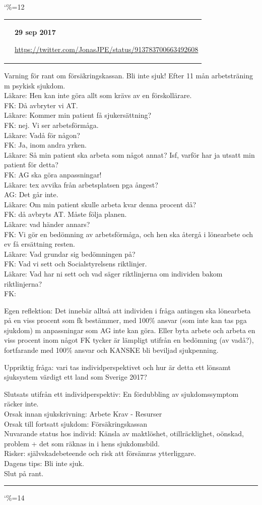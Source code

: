 \documentclass[a4paper]{article}
\makeatletter
\newcommand{\entry}{
\catcode`\%=12
\@entry}
\newcommand{\@entry}[3]{
\bigskip
\begin{tabular*}{\textwidth}{l m{\textwidth-4cm}}
\qrcode{#3} & \textbf{#1}

\medskip

\url{#3}

\end{tabular*}

\medskip


\begin{multicols}{2}
#2
\end{multicols}

\medskip
\hrule

\catcode`\%=14
}
\makeatother
\begin{document}
{\entry{29 sep 2017}{Varning för rant om försäkringskassan. Bli inte sjuk! Efter 11 mån arbetsträning m psykisk sjukdom.\\
Läkare: Hen kan inte göra allt som krävs av en förskollärare.\\
FK: Då avbryter vi AT.\\
Läkare: Kommer min patient få sjukersättning?\\
FK: nej. Vi ser arbetsförmåga.\\
Läkare: Vadå för någon?\\
FK: Ja, inom andra yrken.\\
Läkare: Så min patient ska arbeta som något annat? Isf, varför har ja utsatt min patient för detta?\\
FK: AG ska göra anpassningar!\\
Läkare: tex avvika från arbetsplatsen pga ångest?\\
AG: Det går inte.\\
Läkare: Om min patient skulle arbeta kvar denna procent då?\\
FK: då avbryts AT. Måste följa planen.\\
Läkare: vad händer annars?\\
FK: Vi gör en bedömning av arbetsförmåga, och hen ska återgå i lönearbete och ev få ersättning resten.\\
Läkare: Vad grundar sig bedömningen på?\\
FK: Vad vi sett och Socialstyrelsens riktlinjer.\\
Läkare: Vad har ni sett och vad säger riktlinjerna om individen bakom riktlinjerna?\\
FK: {\Emoji{😮😳}}

Egen reflektion: Det innebär alltså att individen i fråga antingen ska lönearbeta på en viss procent som fk bestämmer, med 100\% ansvar (som inte kan tas pga sjukdom) m anpassningar som AG inte kan göra. Eller byta arbete och arbeta en viss procent inom något FK tycker är lämpligt utifrån en bedömning (av vadå?), fortfarande med 100\% ansvar och KANSKE bli beviljad sjukpenning.

Uppriktig fråga: vari tas individperspektivet och hur är detta ett lönsamt sjuksystem värdigt ett land som Sverige 2017?

Slutsats utifrån ett individperspektiv: En fördubbling av sjukdomssymptom räcker inte.\\
Orsak innan sjukskrivning: Arbete Krav - Resurser\\
Orsak till fortsatt sjukdom: Försäkringskassan\\
Nuvarande status hos individ: Känsla av maktlöshet, otillräcklighet, oönskad, problem + det som räknas in i hens sjukdomsbild.\\
Risker: självskadebeteende och risk att försämras ytterliggare.\\
Dagens tips: Bli inte sjuk.\\
Slut på rant.
}{https://twitter.com/JonasJPE/status/913783700663492608}

}
\end{document}
